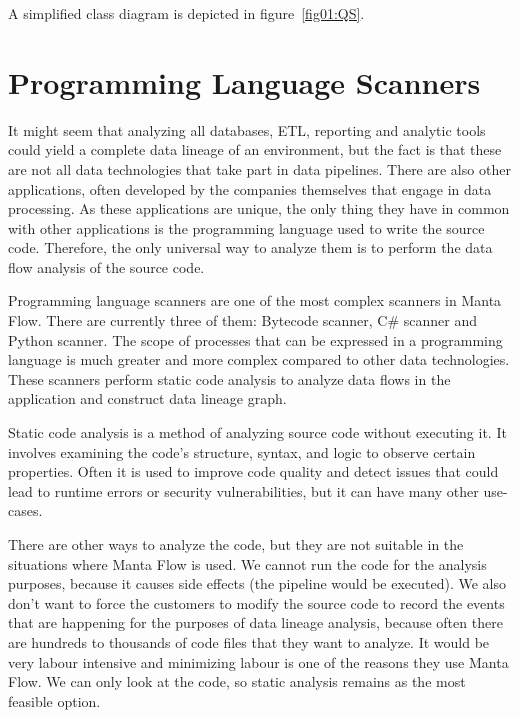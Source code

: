 A simplified class diagram is depicted in figure~\ref{fig01:QS}.

\section{Programming Language Scanners}

It might seem that analyzing all databases, ETL, reporting and analytic tools could yield a complete data lineage of an environment, but the fact is that these are not all data technologies that take part in data pipelines. There are also other applications, often developed by the companies themselves that engage in data processing. As these applications are unique, the only thing they have in common with other applications is the programming language used to write the source code. Therefore, the only universal way to analyze them is to perform the data flow analysis of the source code.
\par
Programming language scanners are one of the most complex scanners in Manta Flow. There are currently three of them: Bytecode scanner, C\# scanner and Python scanner. The scope of processes that can be expressed in a programming language is much greater and more complex compared to other data technologies. These scanners perform static code analysis to analyze data flows in the application and construct data lineage graph.
\par
Static code analysis is a method of analyzing source code without executing it. It involves examining the code's structure, syntax, and logic to observe certain properties. Often it is used to improve code quality and detect issues that could lead to runtime errors or security vulnerabilities, but it can have many other use-cases.
\par
There are other ways to analyze the code, but they are not suitable in the situations where Manta Flow is used. We cannot run the code for the analysis purposes, because it causes side effects (the pipeline would be executed). We also don't want to force the customers to modify the source code to record the events that are happening for the purposes of data lineage analysis, because often there are hundreds to thousands of code files that they want to analyze. It would be very labour intensive and minimizing labour is one of the reasons they use Manta Flow. We can only look at the code, so static analysis remains as the most feasible option.
